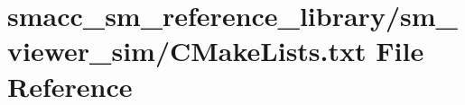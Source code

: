 \hypertarget{sm__reference__library_2sm__viewer__sim_2CMakeLists_8txt}{}\section{smacc\+\_\+sm\+\_\+reference\+\_\+library/sm\+\_\+viewer\+\_\+sim/\+C\+Make\+Lists.txt File Reference}
\label{sm__reference__library_2sm__viewer__sim_2CMakeLists_8txt}
